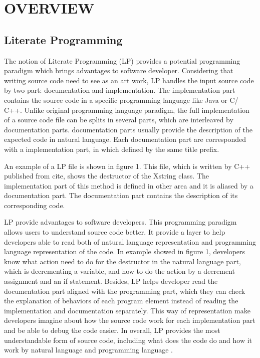 \chapter{OVERVIEW}

\section{Literate Programming}

The notion of Literate  Programming (LP) provides a potential programming paradigm which brings advantages to software developer. Considering that writing source code need to see as an art work, LP handles the input source code by two part: documentation and implementation. The implementation part contains the source code in a specific programming language like Java or C/ C++. Unlike original programming language paradigm, the full implementation of a source code file can be splits in several parts, which are interleaved by documentation parts. documentation parts usually provide the description of the expected code in natural language. Each documentation part are corresponded with a implementation part, in which defined by the same title prefix.


An example of a LP file is shown in figure 1. This file, which is written by C++ published from cite{}, shows the destructor of the Xstring class. The implementation part of this method is defined in other area and it is aliased by a documentation part. The documentation part contains the description of its corresponding code.

LP provide advantages to software developers. This programming paradigm allows users to understand source code better. It provide a layer to help developers able to read both of natural language representation and programming language representation of the code. In example showed in figure 1, developers know what action need to do for the destructor in the natural language part, which is decrementing a variable, and how to do the action by a decrement assignment and an if statement. Besides, LP helps developer read the documentation part aligned with the programming part, which they can check the explanation of behaviors of each program element instead of reading the implementation and documentation separately. This way of representation make developers imagine about how the source code work for each implementation part and be able to debug the code easier. In overall, LP provides the most understandable form of source code, including what does the code do and how it work by natural language and programming language .

